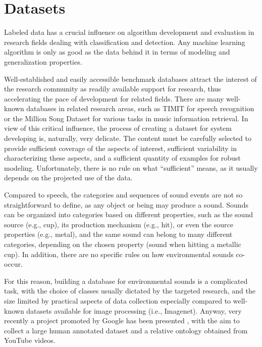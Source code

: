 \section{Datasets}

Labeled data has a crucial influence on algorithm development and evaluation in
research fields dealing with classification and detection. Any machine learning algorithm is only as good as the data behind it in terms of modeling and generalization
properties.

Well-established and easily accessible benchmark databases attract the
interest of the research community as readily available support for research, thus
 accelerating the pace of development for related fields. There are many well-known
databases in related research areas, such as TIMIT \cite{garofolo1993darpa} for speech
recognition or the Million Song Dataset \cite{bertin2011million} for various tasks in
music information retrieval. In view of this critical influence, the process of creating
a dataset for system developing is, naturally, very delicate. The content must be carefully
selected to provide sufficient coverage of the aspects of interest, sufficient variability
in characterizing these aspects, and a sufficient quantity of examples for robust
modeling. Unfortunately, there is no rule on what ``sufficient'' means, as it usually
depends on the projected use of the data.


Compared to speech, the categories and sequences of sound events are not so straightforward to define, as any object or being
may produce a sound. Sounds can be organized into categories based on different
properties, such as the sound source (e.g., cup), its production mechanism (e.g.,
hit), or even the source properties (e.g., metal), and the same sound can belong to
many different categories, depending on the chosen property (sound when hitting
a metallic cup). In addition, there are no specific rules on how environmental
sounds co-occur. 

For this reason, building a database for environmental sounds
is a complicated task, with the choice of classes usually dictated by the targeted
research, and the size limited by practical aspects of data collection especially compared to well-known datasets available for image processing (i.e., Imagenet\cite{deng2009imagenet}). Anyway, very recently a project promoted by Google has been presented \cite{gemmeke2017audio}, with the aim to collect a large human annotated dataset and a relative ontology obtained from YouTube videos.

